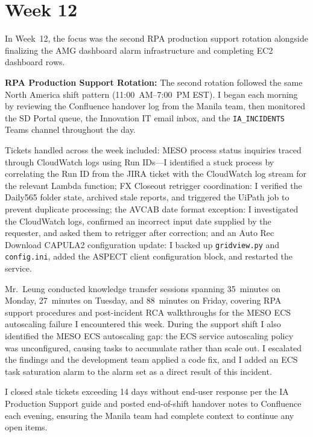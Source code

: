 
\FloatBarrier

\section{Week 12}
\label{sec:week12}

In Week~12, the focus was the second RPA production support rotation
alongside finalizing the AMG dashboard alarm infrastructure and completing
EC2 dashboard rows.

\textbf{RPA Production Support Rotation:} 
The second rotation
followed the same North America shift pattern (11:00~AM--7:00~PM EST).
I began each morning by reviewing the Confluence handover log from the Manila team, then monitored the SD Portal queue, the Innovation IT email inbox, and the \texttt{IA\_INCIDENTS} Teams channel throughout the day.

Tickets handled across the week included: MESO process status inquiries
traced through CloudWatch logs using Run IDs---I identified a stuck process by correlating the Run ID from the JIRA ticket with the CloudWatch log stream for the relevant Lambda function; FX Closeout retrigger
coordination: I verified the Daily565 folder state, archived stale reports, and triggered the UiPath job to prevent duplicate processing; the AVCAB date format exception: I investigated the CloudWatch logs, confirmed an incorrect input date supplied by the requester, and asked them to retrigger after correction; and an Auto Rec Download CAPULA2 configuration update: I backed up \texttt{gridview.py} and \texttt{config.ini}, added the ASPECT client configuration block, and restarted the service.

Mr.\ Leung conducted knowledge transfer sessions spanning 35~minutes on Monday, 27~minutes on Tuesday, and 88~minutes on Friday, covering RPA support procedures and post-incident RCA walkthroughs for the MESO ECS autoscaling failure I encountered this week. During the support shift I also identified the MESO ECS autoscaling gap: the ECS service autoscaling policy was unconfigured, causing tasks to accumulate rather than scale out. I escalated the findings and the development team applied a code fix, and I added an ECS task saturation alarm to the alarm set as a direct result of this incident.

I closed stale tickets exceeding 14 days without end-user response per the IA Production Support guide and posted end-of-shift handover notes to Confluence each evening, ensuring the Manila team had complete context to continue any open items.

